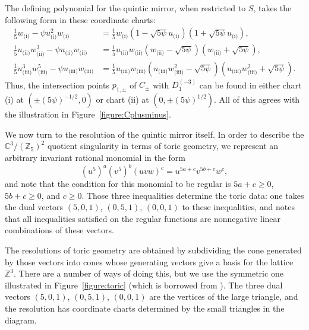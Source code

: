 The defining polynomial for the quintic mirror, when restricted to $S$,
takes the following form in these coordinate charts:
\begin{align*}
\frac15w_{\text{(i)}}-\psi u_{\text{(i)}}^2w_{\text{(i)}}
&=\frac15w_{\text{(i)}}(1-\sqrt{5\psi}u_{\text{(i)}})(1+\sqrt{5\psi}u_{\text{(i)}}),\\
\frac15 u_{\text{(ii)}}w_{\text{(ii)}}^3 -\psi u_{\text{(ii)}}w_{\text{(ii)}}
&=\frac15u_{\text{(ii)}}w_{\text{(ii)}}(w_{\text{(ii)}}-\sqrt{5\psi})(w_{\text{(ii)}}+\sqrt{5\psi}),\\
\frac15u_{\text{(iii)}}^3w_{\text{(iii)}}^5-\psi u_{\text{(iii)}}w_{\text{(iii)}}
&=\frac15u_{\text{(iii)}}w_{\text{(iii)}}(u_{\text{(iii)}}w_{\text{(iii)}}^2-\sqrt{5\psi})(u_{\text{(iii)}}w_{\text{(iii)}}^2+\sqrt{5\psi}).
\end{align*}
Thus, the intersection points $p_{1,\pm}$
of $C_\pm$ with $D_1^{(-3)}$ can be found
in either chart (i) at $(\pm (5\psi)^{-1/2},0)$ or chart (ii) at
$(0,\pm(5\psi)^{1/2})$.
All of this agrees with the illustration in Figure~\ref{figure:Cplusminus}.

We now turn to the resolution of the quintic mirror itself.
In order to describe the $\mathbb{C}^3/(\mathbb{Z}_5)^2$ 
quotient singularity in terms
of toric geometry, we represent an arbitrary invariant rational monomial in
the form
\[ (u^5)^a (v^5)^b (uvw)^c = u^{5a+c} v^{5b+c} w^c,\]
and note that the condition for this monomial to be regular
is $5a+c\ge0$, $5b+c\ge0$, and $c\ge0$.  Those three inequalities
determine the toric data: one takes the dual vectors $(5,0,1)$,
$(0,5,1)$, $(0,0,1)$ to these inequalities, 
and notes that all inequalities satisfied on the regular
functions are nonnegative linear combinations of these vectors.

The resolutions of toric geometry are obtained by subdividing the cone
generated by those vectors into cones whose generating vectors give a
basis for the lattice $\mathbb{Z}^3$.  There are a number of ways of
doing this, but we use the symmetric one illustrated in 
Figure~\ref{figure:toric} (which is borrowed from \cite{geomaspects}).  
The three dual vectors
$(5,0,1)$,
$(0,5,1)$, $(0,0,1)$
are the vertices of the large triangle,
and the resolution has coordinate charts determined by the small
triangles in the diagram.

